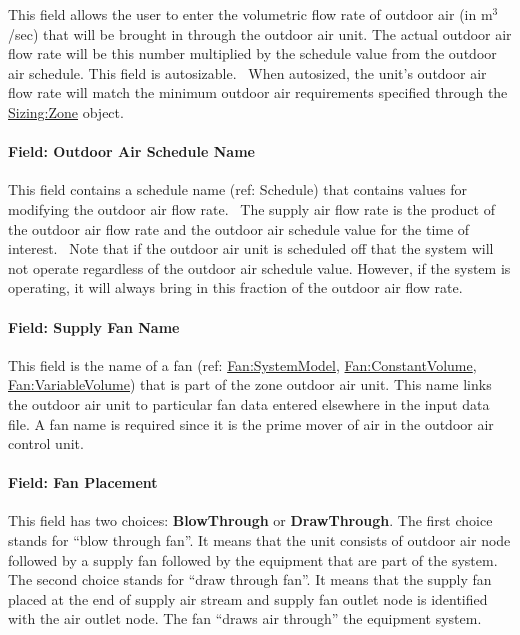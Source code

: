 This field allows the user to enter the volumetric flow rate of outdoor air (in m\(^{3}\)/sec) that will be brought in through the outdoor air unit. The actual outdoor air flow rate will be this number multiplied by the schedule value from the outdoor air schedule. This field is autosizable.~ When autosized, the unit's outdoor air flow rate will match the minimum outdoor air requirements specified through the \hyperref[sizingzone]{Sizing:Zone} object.

\paragraph{Field: Outdoor Air Schedule Name}\label{field-outdoor-air-schedule-name-1}

This field contains a schedule name (ref: Schedule) that contains values for modifying the outdoor air flow rate.~ The supply air flow rate is the product of the outdoor air flow rate and the outdoor air schedule value for the time of interest. ~Note that if the outdoor air unit is scheduled off that the system will not operate regardless of the outdoor air schedule value. However, if the system is operating, it will always bring in this fraction of the outdoor air flow rate.

\paragraph{Field: Supply Fan Name}\label{field-supply-fan-name-000}

This field is the name of a fan (ref: \hyperref[fansystemmodel]{Fan:SystemModel}, \hyperref[fanconstantvolume]{Fan:ConstantVolume}, \hyperref[fanvariablevolume]{Fan:VariableVolume}) that is part of the zone outdoor air unit. This name links the outdoor air unit to particular fan data entered elsewhere in the input data file. A fan name is required since it is the prime mover of air in the outdoor air control unit.

\paragraph{Field: Fan Placement}\label{field-fan-placement-1-001}

This field has two choices: \textbf{BlowThrough} or \textbf{DrawThrough}. The first choice stands for ``blow through fan''. It means that the unit consists of outdoor air node followed by a supply fan followed by the equipment that are part of the system. The second choice stands for ``draw through fan''. It means that the supply fan placed at the end of supply air stream and supply fan outlet node is identified with the air outlet node. The fan ``draws air through'' the equipment system.

